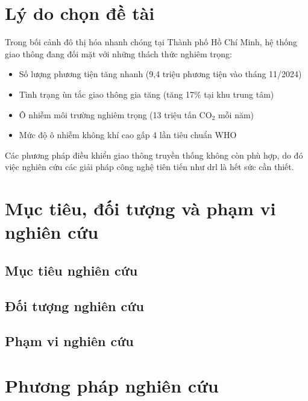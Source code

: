 \section{Lý do chọn đề tài}

Trong bối cảnh đô thị hóa nhanh chóng tại Thành phố Hồ Chí Minh, hệ thống giao thông đang đối mặt với những thách thức nghiêm trọng:

\begin{itemize}
    \item Số lượng phương tiện tăng nhanh (9,4 triệu phương tiện vào tháng 11/2024)
    \item Tình trạng ùn tắc giao thông gia tăng (tăng 17\% tại khu trung tâm)
    \item Ô nhiễm môi trường nghiêm trọng (13 triệu tấn CO$_2$ mỗi năm)
    \item Mức độ ô nhiễm không khí cao gấp 4 lần tiêu chuẩn WHO
\end{itemize}

Các phương pháp điều khiển giao thông truyền thống không còn phù hợp, do đó việc nghiên cứu các giải pháp công nghệ tiên tiến như \ac{drl} là hết sức cần thiết.

\section{Mục tiêu, đối tượng và phạm vi nghiên cứu}
\subsection{Mục tiêu nghiên cứu}


\subsection{Đối tượng nghiên cứu}


\subsection{Phạm vi nghiên cứu}


\section{Phương pháp nghiên cứu}



